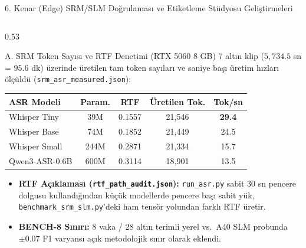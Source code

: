 \documentclass[aspectratio=169,10pt]{beamer}
\begin{document}
\begin{frame}{6. Kenar (Edge) SRM/SLM Doğrulaması ve Etiketleme Stüdyosu Geliştirmeleri}
\scriptsize
\begin{columns}[T]
\begin{column}{0.53\textwidth}
\begin{block}{A. SRM Token Sayısı ve RTF Denetimi (RTX 5060 8 GB)}
7 altın klip ($5{,}734.5$ sn = $95.6$ dk) üzerinde üretilen tam token sayıları ve saniye başı üretim hızları ölçüldü (\texttt{srm\_asr\_measured.json}):
\vspace{0.1cm}
\begin{tabular}{lcccc}
\toprule
\textbf{ASR Modeli} & \textbf{Param.} & \textbf{RTF} & \textbf{Üretilen Tok.} & \textbf{Tok/sn} \\
\midrule
Whisper Tiny & 39M & 0.1557 & 21{,}546 & \textbf{29.4} \\
Whisper Base & 74M & 0.1852 & 21{,}449 & 24.5 \\
Whisper Small & 244M & 0.2871 & 21{,}334 & 15.7 \\
Qwen3-ASR-0.6B & 600M & 0.3114 & 18{,}901 & 13.5 \\
\bottomrule
\end{tabular}
\vspace{0.1cm}
\begin{itemize}
    \item \textbf{RTF Açıklaması (\texttt{rtf\_path\_audit.json}):} \texttt{run\_asr.py} sabit 30 sn pencere dolgusu kullandığından küçük modellerde pencere başı sabit yük, \texttt{benchmark\_srm\_slm.py}'deki ham tensör yolundan farklı RTF üretir.
    \item \textbf{BENCH-8 Sınırı:} 8 vaka / 28 altın terimli yerel vs.\ A40 SLM probunda $\pm 0.07$ F1 varyansı açık metodolojik sınır olarak eklendi.
\end{itemize}
\end{block}
\end{column}


\end{columns}
\end{frame}
\end{document}
